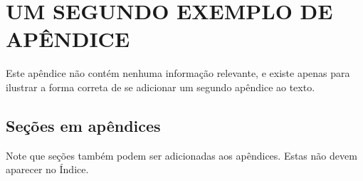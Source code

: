\chapter{UM SEGUNDO EXEMPLO DE APÊNDICE}
Este apêndice não contém nenhuma informação relevante, e existe apenas para ilustrar a forma correta de se adicionar um segundo apêndice ao texto.

\section{Seções em apêndices}
Note que seções também podem ser adicionadas aos apêndices. Estas não devem aparecer no Índice.